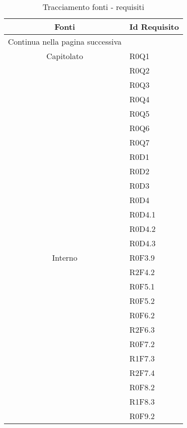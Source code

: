 \begin{center}
    \renewcommand{\arraystretch}{2}
    
    \begin{longtable}{ c m{4cm} }
        
        \rowcolor[HTML]{232f3e}
    
        \rowcolors{1}{tableRow}{}
        \color[HTML]{FFFFFF} \centering\textbf{Fonti} & \color[HTML]{FFFFFF} \centering\textbf{Id Requisito} \\
	\endhead
	    \rowcolor{white}\multicolumn{2}{c}
   { Continua nella pagina successiva} \\
   \endfoot
   \caption [Tracciamento fonti - requisiti]{Tracciamento fonti - requisiti}
	\label{tabella:TracReqF}
   \endlastfoot
	Capitolato & R0Q1\\
	\rowcolor{tableRow}& R0Q2\\
	\rowcolor{tableRow}& R0Q3\\
	\rowcolor{tableRow}& R0Q4\\
	\rowcolor{tableRow}& R0Q5\\
	\rowcolor{tableRow}& R0Q6\\
	\rowcolor{tableRow}& R0Q7\\
	\rowcolor{tableRow}& R0D1\\
	\rowcolor{tableRow}& R0D2\\
	\rowcolor{tableRow}& R0D3\\
	\rowcolor{tableRow}& R0D4\\
	\rowcolor{tableRow}& R0D4.1\\
	\rowcolor{tableRow}& R0D4.2\\
	\rowcolor{tableRow}& R0D4.3\\
	\rowcolor{white}Interno & R0F3.9\\
	\rowcolor{white}& R2F4.2\\
	\rowcolor{white}& R0F5.1\\
	\rowcolor{white}& R0F5.2\\
	\rowcolor{white}& R0F6.2\\
	\rowcolor{white}& R2F6.3\\
	\rowcolor{white}& R0F7.2\\
	\rowcolor{white}& R1F7.3\\
	\rowcolor{white}& R2F7.4\\
	\rowcolor{white}& R0F8.2\\
	\rowcolor{white}& R1F8.3\\
	\rowcolor{white}& R0F9.2\\

\end{longtable}
\end{center}
